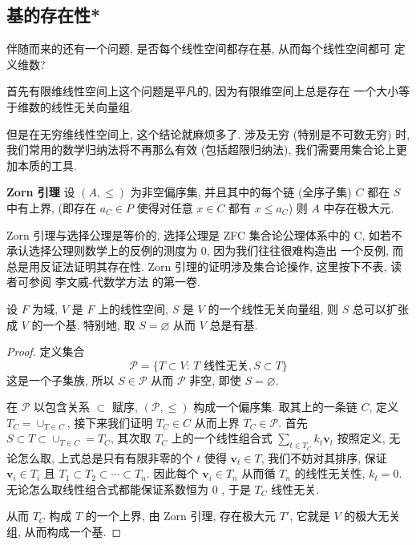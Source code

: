 \documentclass[UTF8]{book}
\begin{document}
\subsection{基的存在性*}

伴随而来的还有一个问题, 是否每个线性空间都存在基, 从而每个线性空间都可
定义维数? 


首先有限维线性空间上这个问题是平凡的, 因为有限维空间上总是存在
一个大小等于维数的线性无关向量组. 

但是在无穷维线性空间上, 这个结论就麻烦多了. 涉及无穷 (特别是不可数无穷) 
时, 我们常用的数学归纳法将不再那么有效 (包括超限归纳法), 
我们需要用集合论上更加本质的工具. 

\begin{lemma}
    \textbf{Zorn 引理} 
    设 $(A,\leq)$ 为非空偏序集, 
    并且其中的每个链 (全序子集) $C$ 都在 $S$ 中有上界, 
    (即存在 $a_{C}\in P$ 使得对任意 $x \in C$ 都有 $x\leq a_{C}$) 
    则 $A$ 中存在极大元. 
\end{lemma}

Zorn 引理与选择公理是等价的, 选择公理是 ZFC 集合论公理体系中的 C, 
如若不承认选择公理则数学上的反例的测度为 0, 因为我们往往很难构造出
一个反例, 而总是用反证法证明其存在性. 
Zorn 引理的证明涉及集合论操作, 这里按下不表, 读者可参阅
李文威-代数学方法 的第一卷. 

\begin{theorem}
    设 $F$ 为域, $V$ 是 $F$ 上的线性空间, $S$ 是 $V$ 的一个线性无关向量组, 
    则 $S$ 总可以扩张成 $V$ 的一个基. 特别地, 取 $S=\varnothing$ 
    从而 $V$ 总是有基. 
\end{theorem}

\begin{proof}
    定义集合 
    $$ \mathcal{P} = \{T\subset V:\,T\mbox{ 线性无关}, S\subset T\} $$
    这是一个子集族, 所以 $S \in \mathcal{P}$ 从而 $\mathcal{P}$ 非空, 
    即使 $S=\varnothing$. 

    在 $\mathcal{P}$ 以包含关系 $\subset$ 赋序, $(\mathcal{P},\leq)$ 
    构成一个偏序集. 
    取其上的一条链 $C$, 定义 $T_{C} = \cup_{T \in C} $, 
    接下来我们证明 $T_{C} \in C$ 从而上界 $T_{C} \in \mathcal{P}$. 
    首先 $S\subset T \subset \cup_{T \in C} = T_{C}$, 
    其次取 $T_C$ 上的一个线性组合式 
    $\sum_{t \in T_C} k_t\boldsymbol{v}_t$ 
    按照定义, 无论怎么取, 上式总是只有有限非零的个 $t$ 使得 
    $\boldsymbol{v}_t \in T$,  
    我们不妨对其排序, 保证 $\boldsymbol{v}_i \in T_i$ 且 
    $T_1 \subset T_2 \subset \cdots \subset T_n$. 
    因此每个 $\boldsymbol{v}_i \in T_n$ 从而循 $T_n$ 的线性无关性, 
    $k_t = 0$. 无论怎么取线性组合式都能保证系数恒为 0 , 
    于是 $T_{C}$ 线性无关. 

    从而 $T_{C}$ 构成 $T$ 的一个上界, 由 Zorn 引理, 
    存在极大元 $T'$, 它就是 $V$ 的极大无关组, 从而构成一个基. 
\end{proof}
\end{document}
